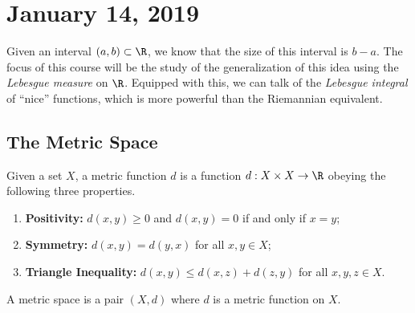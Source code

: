 
\section{January 14, 2019}

Given an interval $(a,b) \subset \R$, we know that the size of this interval is $b-a$. The focus of this course will be the study of the generalization of this idea using the \emph{Lebesgue measure} on $\R$. Equipped with this, we can talk of the \emph{Lebesgue integral} of ``nice'' functions, which is more powerful than the Riemannian equivalent.

\subsection*{The Metric Space}

\begin{definition}
Given a set $X$, a metric function $d$ is a function $d : X \times X \to \R$ obeying the following three properties.
\begin{enumerate}
\item \textbf{Positivity:} $d(x,y) \geq 0$ and $d(x,y) = 0$ if and only if $x = y$;
\item \textbf{Symmetry:} $d(x,y) = d(y,x)$ for all $x,y \in X$;
\item \textbf{Triangle Inequality:} $d(x,y) \leq d(x,z) + d(z,y)$ for all $x,y,z \in X$. 
\end{enumerate}
A metric space is a pair $(X,d)$ where $d$ is a metric function on $X$.
\end{definition}

